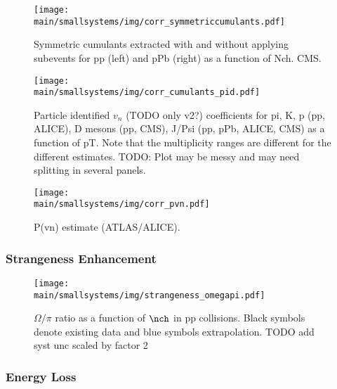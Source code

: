 \documentclass[../report.tex]{subfiles}
\providecommand{\main}{..}
\begin{document}
\begin{figure}[ht]
\centering
\texttt{[image: \\main/smallsystems/img/corr\_symmetriccumulants.pdf]}
\caption{Symmetric cumulants extracted with and without applying subevents for pp (left) and pPb (right) as a function of Nch. CMS.}
\label{fig:smallsystems_corr_symmetriccumulants}
\end{figure}

\begin{figure}[ht]
\centering
\texttt{[image: \\main/smallsystems/img/corr\_cumulants\_pid.pdf]}

\caption{Particle identified $v_n$ (TODO only v2?) coefficients for pi, K, p (pp, ALICE), D mesons (pp, CMS), J/Psi (pp, pPb, ALICE, CMS) as a function of pT. Note that the multiplicity ranges are different for the different estimates. TODO: Plot may be messy and may need splitting in several panels.}
\label{fig:smallsystems_corr_cumulants_pid}
\end{figure}

\begin{figure}[ht]
\centering
\texttt{[image: \\main/smallsystems/img/corr\_pvn.pdf]}

\caption{P(vn) estimate (ATLAS/ALICE).}
\label{fig:smallsystems_corr_pvn}
\end{figure}


\subsubsection{Strangeness Enhancement}

\begin{figure}[ht]
\centering
\texttt{[image: \\main/smallsystems/img/strangeness\_omegapi.pdf]}

\caption{$\Omega/\pi$ ratio as a function of $\nch$ in pp collisions. Black symbols denote existing data \cite{ALICE:2017jyt} and blue symbols extrapolation. TODO add syst unc scaled by factor 2}
\label{fig:smallsystems_strangeness_omega_pi}
\end{figure}

\subsubsection{Energy Loss}
\end{document}
